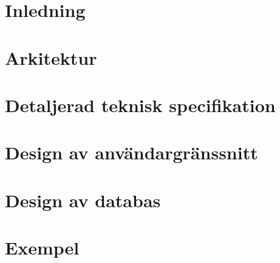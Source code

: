 \pagestyle{plain}
\setcounter{page}{1}

\chapter{Inledning}\label{cha:inledning}


\chapter{Arkitektur}\label{cha:arkitektur}


\chapter{Detaljerad teknisk specifikation}\label{cha:tekspec}



\chapter{Design av användargränssnitt}\label{cha:gui}


\chapter{Design av databas}\label{cha:databas}


\chapter{Exempel}\label{cha:exempel}

